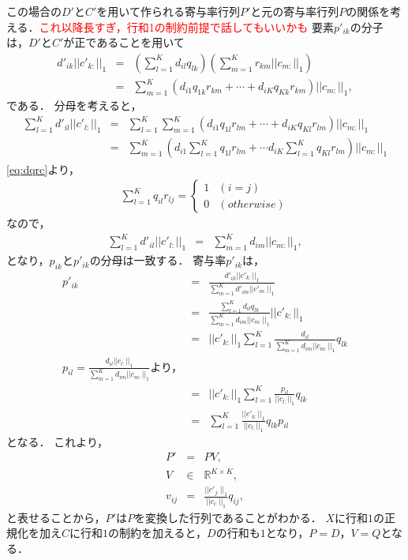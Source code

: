 この場合の$D'$と$C'$を用いて作られる寄与率行列$P'$と元の寄与率行列$P$の関係を考える．\textcolor{red}{これ以降長すぎ，行和1の制約前提で話してもいいかも}
要素$p'_{ik}$の分子は，$D'$と$C'$が正であることを用いて
\begin{eqnarray}
	d'_{ik} ||c'_{k:}||_1 &=& \left( \sum_{l = 1}^K d_{il} q_{lk} \right) \left( \sum_{m = 1}^K r_{km} ||c_{m:}||_1 \right) \\
	&=& \sum_{m = 1}^K \left( d_{i1} q_{1k} r_{km} + \cdots + d_{iK} q_{Kk} r_{km} \right) ||c_{m:}||_1,
\end{eqnarray}
である．
分母を考えると，
\begin{eqnarray}
	\sum_{l=1}^K d'_{il}||c'_{l:} ||_1 &=& \sum_{l = 1}^K \sum_{m = 1}^K \left( d_{i1} q_{1l} r_{lm} + \cdots + d_{iK} q_{Kl} r_{lm} \right) ||c_{m:}||_1 \\
	&=& \sum_{m = 1}^K \left( d_{i1} \sum_{l = 1}^K q_{1l}r_{lm} + \cdots d_{iK} \sum_{l = 1}^K q_{Kl} r_{lm}\right) ||c_{m:}||_1
\end{eqnarray}
\eqref{eq:dqrc}より，
\begin{eqnarray}
	\sum_{l = 1}^{K} q_{il} r_{lj} = \begin{cases}
    1 & (i = j) \\
    0 & (otherwise)
  \end{cases}
\end{eqnarray}
なので，
\begin{eqnarray}
	\sum_{l=1}^K d'_{il} || c'_{l:} ||_1 &=& \sum_{m = 1}^K d_{im} ||c_{m:}||_1,
\end{eqnarray}
となり，$p_{ik}$と$p'_{ik}$の分母は一致する．
寄与率$p'_{ik}$は，
\begin{eqnarray}
	p'_{ik} &=& \frac{ d'_{ik} || c'_{k:}||_1 }{ \sum_{m = 1}^K d'_{im} || c'_{m:}||_1 } \\
	&=& \frac{\sum_{l = 1}^K d_{il} q_{lk}}{\sum_{m=1}^K d_{im} || c_{m:} ||_1} ||c'_{k:}||_1 \\
	&=& ||c'_{k:}||_1 \sum_{l = 1}^K \frac{d_{il}}{\sum_{m=1}^K d_{im} || c_{m:} ||_1} q_{lk} \\
	p_{il} = \frac{d_{il} ||c_{l:}||_1 }{ \sum_{m = 1}^K d_{im} || c_{m:} ||_1 } \text{より，} \\
	&=& ||c'_{k:}||_1 \sum_{l = 1}^K \frac{p_{il}}{ ||c_{l:}||_1 } q_{lk}\\
	&=& \sum_{l = 1}^K \frac{ ||c'_{k:}||_1 }{ ||c_{l:}||_1 } q_{lk} p_{il}
\end{eqnarray}
となる．
これより，
\begin{eqnarray}
	P' &=& PV, \\
	V &\in& \mathbb{R}^{K \times K}, \\
	v_{ij} &=& \frac{ || c'_{j:} ||_1 }{|| c_{i:} ||_1} q_{ij},
\end{eqnarray}
と表せることから，$P'$は$P$を変換した行列であることがわかる．
$X$に行和$1$の正規化を加え$C$に行和$1$の制約を加えると，$D$の行和も$1$となり，$P = D$，$V = Q$となる．

